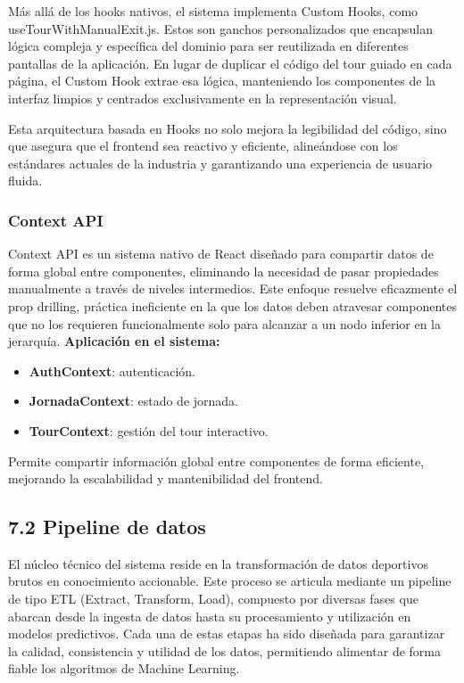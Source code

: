 Más allá de los hooks nativos, el sistema implementa Custom Hooks, como useTourWithManualExit.js. 
Estos son ganchos personalizados que encapsulan lógica compleja y específica del dominio para ser 
reutilizada en diferentes pantallas de la aplicación. En lugar de duplicar el código del tour guiado 
en cada página, el Custom Hook extrae esa lógica, manteniendo los componentes de la interfaz limpios 
y centrados exclusivamente en la representación visual.

Esta arquitectura basada en Hooks no solo mejora la legibilidad del código, sino que asegura que el 
frontend sea reactivo y eficiente, alineándose con los estándares actuales de la industria y 
garantizando una experiencia de usuario fluida.

\subsubsection{Context API}

Context API es un sistema nativo de React diseñado para compartir datos de forma global entre componentes,
 eliminando la necesidad de pasar propiedades manualmente a través de niveles intermedios. 
 Este enfoque resuelve eficazmente el prop drilling, práctica ineficiente en la que los datos deben atravesar 
 componentes que no los requieren funcionalmente solo para alcanzar a un nodo inferior en la jerarquía.
\textbf{Aplicación en el sistema:}
\begin{itemize}
\item \textbf{AuthContext}: autenticación.
\item \textbf{JornadaContext}: estado de jornada.
\item \textbf{TourContext}: gestión del tour interactivo.
\end{itemize}

Permite compartir información global entre componentes de forma eficiente,
mejorando la escalabilidad y mantenibilidad del frontend.


\subsection{7.2 Pipeline de datos}
El núcleo técnico del sistema reside en la transformación de datos deportivos
brutos en conocimiento accionable. Este proceso se articula mediante un pipeline
de tipo ETL (Extract, Transform, Load), compuesto por diversas fases que abarcan
desde la ingesta de datos hasta su procesamiento y utilización en modelos
predictivos.
Cada una de estas etapas ha sido diseñada para garantizar la calidad,
consistencia y utilidad de los datos, permitiendo alimentar de forma fiable los
algoritmos de Machine Learning.

